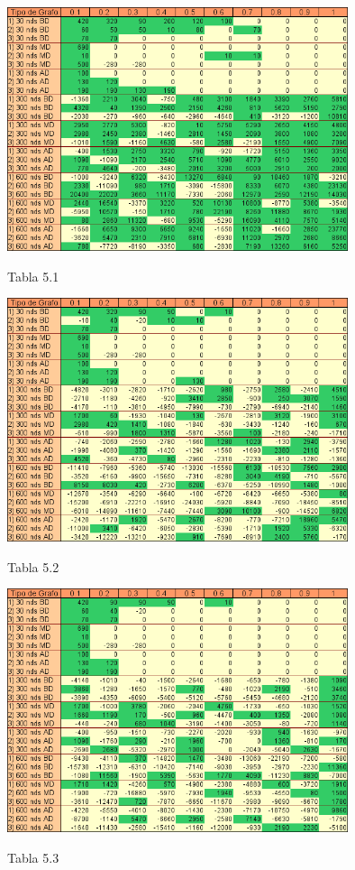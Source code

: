 \documentclass[a4paper,11pt] {article}
\begin{document}
\begin{center}
 \includegraphics[width=0.75\textwidth]{tablas/tablaGrasp30-1.png}
\begin{center}
Tabla 5.1
\end{center}
\end{center}
\begin{center}
 \includegraphics[width=0.75\textwidth]{tablas/tablaGrasp100-1.png}
\begin{center}
Tabla 5.2
\end{center}
\end{center}
\begin{center}
 \includegraphics[width=0.75\textwidth]{tablas/tablaGrasp300-1.png}
\begin{center}
Tabla 5.3
\end{center}
\end{center}
\end{document}
